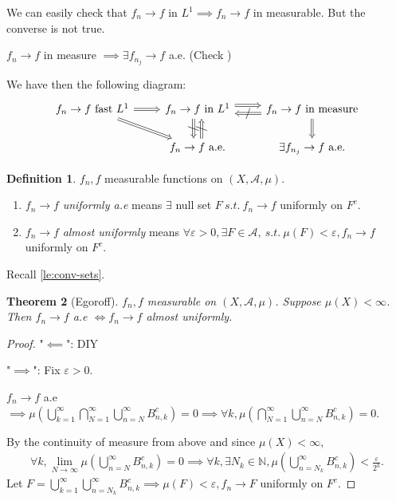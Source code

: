 \documentclass{report}
\newcommand{\N}{\mathbb{N}}
\newcommand{\st}{\ s.t.\ }
\newcommand{\cA}{\mathcal{A}}
\newtheorem{theorem}{Theorem}[chapter]
\theoremstyle{definition}
\newtheorem{definition}[theorem]{Definition}
\theoremstyle{remark}
\begin{document}
We can easily check that $f_n \to f$ in $L^1 \implies f_n \to f$ in measurable. But the converse is not true.

$f_n \to f$ in measure $\implies \exists f_{n_j} \to f$ a.e. (Check \cite{follandRealAnalysisModern1999})

We have then the following diagram:
\[
	\begin{tikzcd}
	\text{$f_n \to f$ fast $L^1$} 
		\arrow[r, Rightarrow] 
		\arrow[dr, Rightarrow] 
		& \text{$f_n \to f$ in $L^1$} 
			\arrow[r, Rightarrow, shift left=1.5] 
			\arrow[r, "/" marking, Leftarrow, shift right=1.5] 
				& \text{$f_n \to f$ in measure}  \\
		& \text{$f_n \to f$ a.e.}  \arrow[u, "/" marking, Leftarrow, shift left=1.5] \arrow[u, "/" marking, Rightarrow, shift right=1.5] & \text{$\exists f_{n_j} \to f$ a.e.}  \arrow[u, Leftarrow]
	\end{tikzcd}
\]

\begin{definition}
	$f_n, f$ measurable functions on $(X, \cA, \mu)$.
	\begin{enumerate}
		\item $f_n \to f$ \emph{uniformly a.e} means $\exists$ null set $F \st f_n \to f$ uniformly on $F^c$.
		\item $f_n \to f$ \emph{almost uniformly} means $\forall \varepsilon > 0, \exists F \in \cA, \st \mu(F) < \varepsilon, f_n \to f$ uniformly on $F^c$.
	\end{enumerate}
\end{definition}
Recall \ref{le:conv-sets}.


\begin{theorem}[Egoroff]
	$f_n, f$ measurable on $(X, \cA, \mu)$. Suppose $\mu(X) < \infty$. Then $f_n \to f$ a.e $\iff f_n \to f$ almost uniformly.
\end{theorem}
\begin{proof}
	"$\impliedby$": DIY
	
	"$\implies$": Fix $\varepsilon > 0$.

	$f_n \to f$ a.e $\implies \displaystyle \mu\left(\bigcup_{k = 1}^\infty \bigcap_{N = 1}^\infty \bigcup_{n = N}^\infty B^c_{n, k}\right) = 0 \implies \forall k, \mu\left(\bigcap_{N = 1}^\infty \bigcup_{n = N}^\infty B^c_{n, k}\right) = 0$.

	By the continuity of measure from above and since $\mu(X) < \infty$, 
	\begin{align*}
		\forall k, \lim_{N \to \infty} \mu\left(\bigcup_{n = N}^\infty B^c_{n, k}\right) = 0 \implies \forall k, \exists N_k \in \N, \mu\left(\bigcup_{n = N_k}^\infty B^c_{n, k}\right) < \frac{\varepsilon}{2^k}.
	\end{align*}
	Let $\displaystyle F = \bigcup_{k = 1}^\infty \bigcup_{n = N_k}^\infty B^c_{n, k} \implies \mu(F) < \varepsilon, f_n \to F$ uniformly on $F^c$.
\end{proof}
\end{document}
